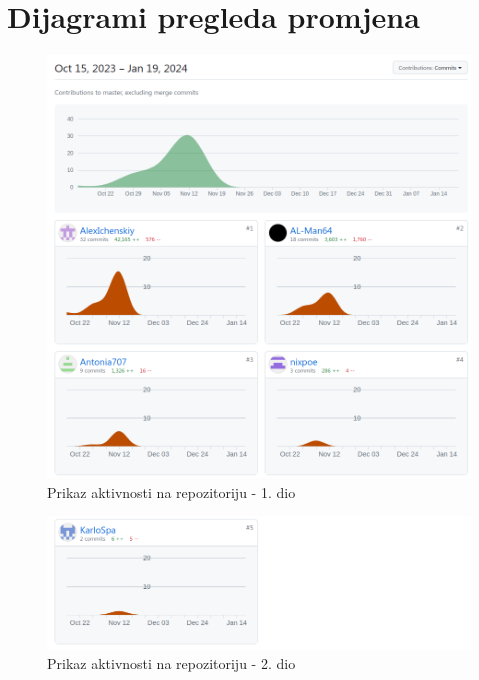 \eject
\section*{Dijagrami pregleda promjena}

\begin{figure}[H]
	\includegraphics[scale=0.6]{slike/Contributors.png}
	\centering
	\caption{Prikaz aktivnosti na repozitoriju - 1. dio}
	\label{fig:repo_activiry_pt1}
\end{figure}

\begin{figure}[H]
	\includegraphics[scale=0.6]{slike/Contributors_Karlo.png}
	\centering
	\caption{Prikaz aktivnosti na repozitoriju - 2. dio}
	\label{fig:repo_activity_pt2}
\end{figure}

